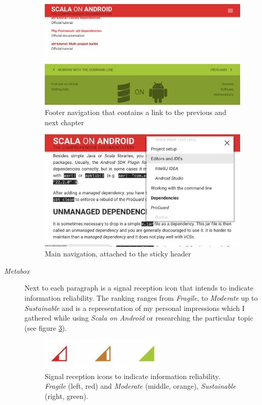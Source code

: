 \begin{description}
	\begin{figure}[H]
		\includegraphics[width=\textwidth]{asset/story-telling.png}
		\caption{Footer navigation that contains a link to the previous and next chapter}
		\label{story-telling}
	\end{figure}

	\begin{figure}[H]
		\includegraphics[width=\textwidth]{asset/navigation.png}
		\caption{Main navigation, attached to the sticky header}
		\label{navigation}
	\end{figure}

	\item[\textit{Metabox}]\hfill

	Next to each paragraph is a signal reception icon that intends to indicate information reliability. The ranking ranges from \textit{Fragile}, to \textit{Moderate} up to \textit{Sustainable} and is a representation of my personal impressions which I gathered while using \textit{Scala on Android} or researching the particular topic (see figure \ref{reception-icons}).

	\begin{figure}[H]
		\center
		\includegraphics[width=6cm]{asset/reception-icons.png}
		\caption{Signal reception icons to indicate information reliability. \textit{Fragile} (left, red) and \textit{Moderate} (middle, orange), \textit{Sustainable} (right, green).}
		\label{reception-icons}
	\end{figure}


\end{description}
